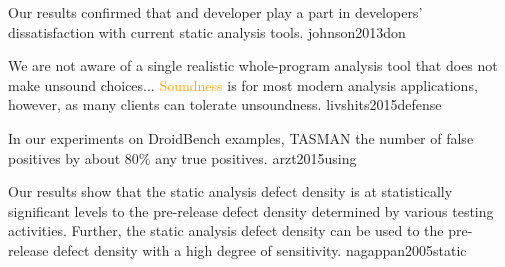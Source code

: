 \documentclass{article}
\begin{document}
  {Our results confirmed that  and developer  play a part in developers' dissatisfaction with current static analysis tools.}
  {johnson2013don}

  {We are not aware of a single realistic whole-program analysis tool that does not  make unsound choices... \textcolor{orange}{Soundness} is  for most modern analysis applications, however, as many clients can tolerate unsoundness.}
  {livshits2015defense}

  {In our experiments on DroidBench examples, TASMAN  the number of false positives by about 80\%  any true positives.}
  {arzt2015using}

  {Our results show that the static analysis defect density is  at statistically significant levels to the pre-release defect density determined by various testing activities. Further, the static analysis defect density can be used to  the pre-release defect density with a high degree of sensitivity.}
  {nagappan2005static}



\end{document}
